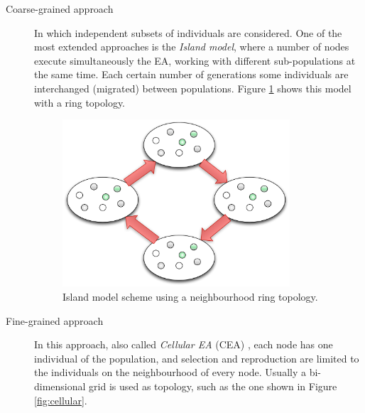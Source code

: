 \documentclass{article}
\begin{document}
\begin{description}
\item[Coarse-grained approach] In which independent subsets of individuals are considered. One of the most extended approaches is the \textit{Island model}, where a number of nodes execute simultaneously the EA, working with different sub-populations at the same time. Each certain number of generations some individuals are interchanged (migrated) between populations. Figure \ref{fig:ring} shows this model with a ring topology.

\begin{figure}[tb]
\centering
\includegraphics[width=20pc]{ring}
\caption{Island model scheme using a neighbourhood ring topology.}
\label{fig:ring}
\end{figure}

\item[Fine-grained approach] In this approach, also called \textit{Cellular EA} (CEA) \cite{alba-cellular-2008}, each node has one individual of the population, and selection and reproduction are limited to the individuals on the neighbourhood of every node. Usually a bi-dimensional grid is used as topology, such as the one shown in Figure \ref{fig:cellular}.


\end{description}
\end{document}
